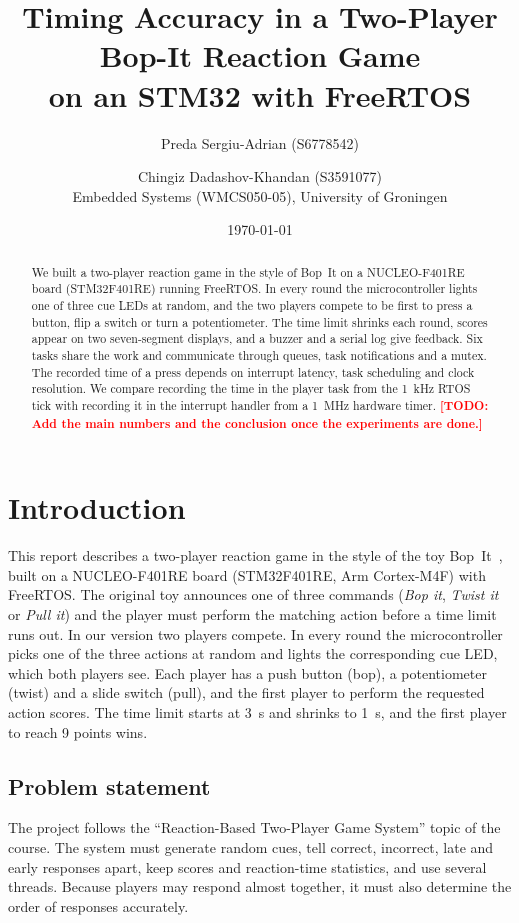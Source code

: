 \documentclass[11pt, a4paper]{article}
\title{\textbf{Timing Accuracy in a Two-Player Bop-It Reaction Game\\ on an STM32 with FreeRTOS}}
\author{Preda Sergiu-Adrian (S6778542) \and Chingiz Dadashov-Khandan (S3591077)\\[4pt]
\normalsize Embedded Systems (WMCS050-05), University of Groningen}
\date{\today}
\newcommand{\todo}[1]{\textcolor{red}{\textbf{[TODO: #1]}}}
\begin{document}
\maketitle

\begin{abstract}
We built a two-player reaction game in the style of Bop~It on a NUCLEO-F401RE board (STM32F401RE) running FreeRTOS. In every round the microcontroller lights one of three cue LEDs at random, and the two players compete to be first to press a button, flip a switch or turn a potentiometer. The time limit shrinks each round, scores appear on two seven-segment displays, and a buzzer and a serial log give feedback. Six tasks share the work and communicate through queues, task notifications and a mutex. The recorded time of a press depends on interrupt latency, task scheduling and clock resolution. We compare recording the time in the player task from the 1~kHz RTOS tick with recording it in the interrupt handler from a 1~MHz hardware timer. \todo{Add the main numbers and the conclusion once the experiments are done.}
\end{abstract}

\section{Introduction}
\label{sec:intro}

This report describes a two-player reaction game in the style of the toy Bop~It~\cite{bopit}, built on a NUCLEO-F401RE board (STM32F401RE, Arm Cortex-M4F) with FreeRTOS. The original toy announces one of three commands (\emph{Bop it}, \emph{Twist it} or \emph{Pull it}) and the player must perform the matching action before a time limit runs out. In our version two players compete. In every round the microcontroller picks one of the three actions at random and lights the corresponding cue LED, which both players see. Each player has a push button (bop), a potentiometer (twist) and a slide switch (pull), and the first player to perform the requested action scores. The time limit starts at \SI{3}{\second} and shrinks to \SI{1}{\second}, and the first player to reach 9 points wins.

\subsection{Problem statement}

The project follows the ``Reaction-Based Two-Player Game System'' topic of the course. The system must generate random cues, tell correct, incorrect, late and early responses apart, keep scores and reaction-time statistics, and use several threads. Because players may respond almost together, it must also determine the order of responses accurately.
\end{document}
